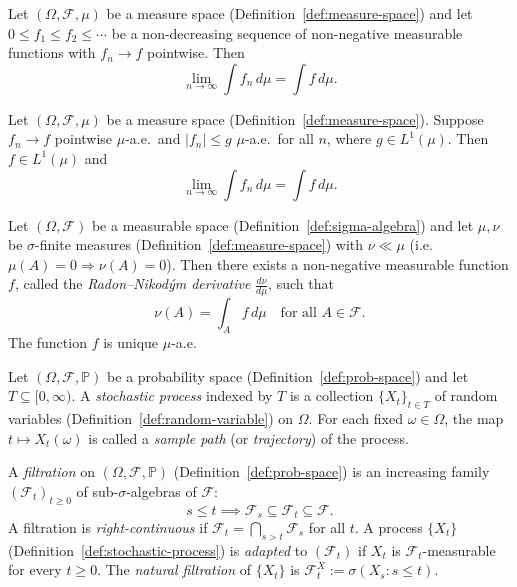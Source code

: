 \begin{theorem}
\label{thm:mct}
Let $(\Omega, \mathcal{F}, \mu)$ be a measure space (Definition~\ref{def:measure-space}) and let $0 \leq f_1 \leq f_2 \leq \cdots$ be a non-decreasing sequence of non-negative measurable functions with $f_n \to f$ pointwise.
Then
\[
  \lim_{n \to \infty} \int f_n\, d\mu = \int f\, d\mu.
\]
\end{theorem}

\begin{theorem}
\label{thm:dct}
Let $(\Omega, \mathcal{F}, \mu)$ be a measure space (Definition~\ref{def:measure-space}).
Suppose $f_n \to f$ pointwise $\mu$-a.e.\ and $|f_n| \leq g$ $\mu$-a.e.\ for all $n$, where $g \in L^1(\mu)$.
Then $f \in L^1(\mu)$ and
\[
  \lim_{n \to \infty} \int f_n\, d\mu = \int f\, d\mu.
\]
\end{theorem}

\begin{theorem}
\label{thm:radon-nikodym}
Let $(\Omega, \mathcal{F})$ be a measurable space (Definition~\ref{def:sigma-algebra}) and let $\mu, \nu$ be $\sigma$-finite measures (Definition~\ref{def:measure-space}) with $\nu \ll \mu$ (i.e.\ $\mu(A) = 0 \Rightarrow \nu(A) = 0$).
Then there exists a non-negative measurable function $f$, called the \emph{Radon--Nikod\'{y}m derivative} $\frac{d\nu}{d\mu}$, such that
\[
  \nu(A) = \int_A f\, d\mu \quad \text{for all } A \in \mathcal{F}.
\]
The function $f$ is unique $\mu$-a.e.
\end{theorem}

\begin{definition}
\label{def:stochastic-process}
Let $(\Omega, \mathcal{F}, \mathbb{P})$ be a probability space (Definition~\ref{def:prob-space}) and let $T \subseteq [0, \infty)$.
A \emph{stochastic process} indexed by $T$ is a collection $\{X_t\}_{t \in T}$ of random variables (Definition~\ref{def:random-variable}) on $\Omega$.
For each fixed $\omega \in \Omega$, the map $t \mapsto X_t(\omega)$ is called a \emph{sample path} (or \emph{trajectory}) of the process.
\end{definition}

\begin{definition}
\label{def:filtration}
A \emph{filtration} on $(\Omega, \mathcal{F}, \mathbb{P})$ (Definition~\ref{def:prob-space}) is an increasing family $(\mathcal{F}_t)_{t \geq 0}$ of sub-$\sigma$-algebras of $\mathcal{F}$:
\[
  s \leq t \implies \mathcal{F}_s \subseteq \mathcal{F}_t \subseteq \mathcal{F}.
\]
A filtration is \emph{right-continuous} if $\mathcal{F}_t = \bigcap_{s > t} \mathcal{F}_s$ for all $t$.
A process $\{X_t\}$ (Definition~\ref{def:stochastic-process}) is \emph{adapted} to $(\mathcal{F}_t)$ if $X_t$ is $\mathcal{F}_t$-measurable for every $t \geq 0$.
The \emph{natural filtration} of $\{X_t\}$ is $\mathcal{F}_t^X := \sigma(X_s : s \leq t)$.
\end{definition}

